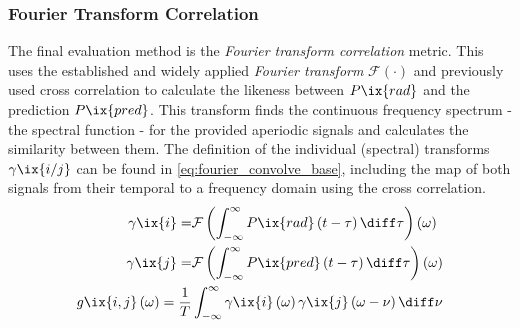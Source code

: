             \subsubsection*{Fourier Transform Correlation}%
%
                The final evaluation method is the \textit{Fourier transform correlation} metric. This uses the established and widely applied \textit{Fourier transform} $\mathcal{F}\left(\cdot\right)$ and previously used cross correlation to calculate the likeness between $P\ix{rad}$ and the prediction $P\ix{pred}$. This transform finds the continuous frequency spectrum - the spectral function - for the provided aperiodic signals and calculates the similarity between them. The definition of the individual (spectral) transforms $\gamma\ix{i/j}$ can be found in \cref{eq:fourier_convolve_base}, including the map of both signals from their temporal to a frequency domain using the cross correlation.%
%
                \begin{align}%
                    \begin{split}\label{eq:fourier_convolve_base}%
                        \gamma\ix{i}=&\mathcal{F}\left(\int_{-\infty}^{\infty}P\ix{rad}\left(t-\tau\right)\diff\tau\right)\left(\omega\right)\\%
                        \gamma\ix{j}=&\mathcal{F}\left(\int_{-\infty}^{\infty}P\ix{pred}\left(t-\tau\right)\diff\tau\right)\left(\omega\right)\\%
                        g\ix{i,j}\left(\omega\right)=\frac{1}{T}&\int_{-\infty}^{\infty}\gamma\ix{i}\left(\omega\right)\gamma\ix{j}\left(\omega-\nu\right)\diff\nu%
                    \end{split}%
                \end{align}%
%
